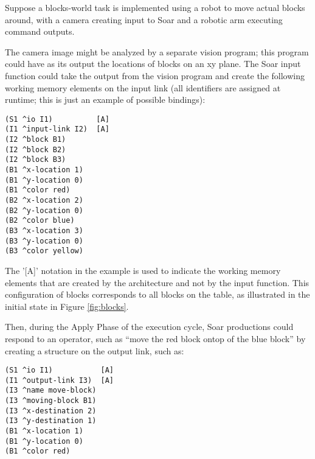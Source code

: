 Suppose a blocks-world task is implemented using a robot to move actual blocks around, with a camera creating input to Soar and a robotic arm executing command outputs.

\begin{figure}
	\label{fig:blocks-inputlink}
\end{figure}

The camera image might be analyzed by a separate vision program; this program could have as its output the locations of blocks on an xy plane. The Soar input function could take the output from the vision program and create the following working memory elements on the input link (all identifiers are assigned at runtime; this is just an example of possible bindings):

\begin{verbatim}
(S1 ^io I1)          [A]
(I1 ^input-link I2)  [A]
(I2 ^block B1)
(I2 ^block B2)
(I2 ^block B3)
(B1 ^x-location 1)
(B1 ^y-location 0)
(B1 ^color red)
(B2 ^x-location 2)
(B2 ^y-location 0)
(B2 ^color blue)
(B3 ^x-location 3)
(B3 ^y-location 0)
(B3 ^color yellow)
\end{verbatim}
\vspace{6pt}

The '[A]' notation in the example is used to indicate the working memory elements that are created by the architecture and not by the input function. This configuration of blocks corresponds to all blocks on the table, as illustrated in the initial state in Figure \ref{fig:blocks}.

\begin{figure}
	\label{fig:blocks-outputlink}
\end{figure}

Then, during the Apply Phase of the execution cycle, Soar productions could respond to an operator, such as ``move the red block ontop of the blue block'' by creating a structure on the output link, such as:

\begin{verbatim}
(S1 ^io I1)           [A]
(I1 ^output-link I3)  [A]
(I3 ^name move-block)
(I3 ^moving-block B1)
(I3 ^x-destination 2)
(I3 ^y-destination 1)
(B1 ^x-location 1)
(B1 ^y-location 0)
(B1 ^color red)
\end{verbatim}
\vspace{12pt}

